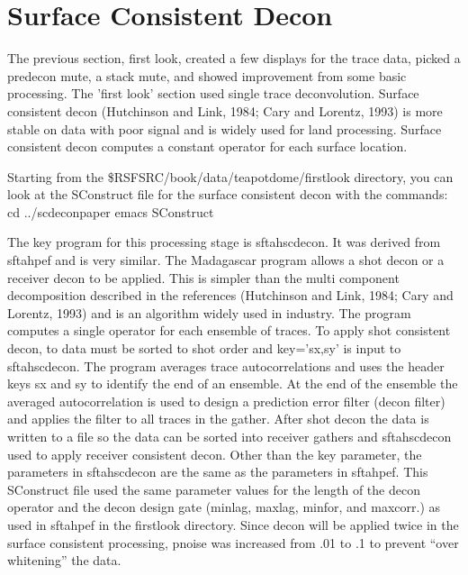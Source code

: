 

\section{Surface Consistent Decon}
The previous section, first look, created a few displays for the trace data, picked a predecon mute, a stack mute, and showed improvement from some basic processing.  The 'first look' section used single trace deconvolution.  Surface consistent decon (Hutchinson and Link, 1984; Cary and Lorentz, 1993) is more stable on data with poor signal and is widely used for land processing.  Surface consistent decon computes a constant operator for each surface location.  

Starting from the \$RSFSRC/book/data/teapotdome/firstlook directory, you can look at the SConstruct file for the surface consistent decon with the commands:
cd ../scdeconpaper
emacs SConstruct

The key program for this processing stage is sftahscdecon.  It was derived from sftahpef and is very similar.  The Madagascar program allows a shot decon or a receiver decon to be applied.  This is simpler than the multi component decomposition described in the references  (Hutchinson and Link, 1984; Cary and Lorentz, 1993) and is an algorithm widely used in industry.  The program computes a single operator for each ensemble of traces.  To apply shot consistent decon, to data must be sorted to shot order and key='sx,sy' is input to sftahscdecon.  The program averages trace autocorrelations and uses the header keys sx and sy to identify the end of an ensemble.  At the end of the ensemble the averaged autocorrelation is used to design a prediction error filter (decon filter) and applies the filter to all traces in the gather.  After shot decon the data is written to a file so the data can be sorted into receiver gathers and sftahscdecon used to apply receiver consistent decon.  Other than the key parameter, the parameters in sftahscdecon are the same as the parameters in sftahpef.  This SConstruct file used the same parameter values for the length of the decon operator and the decon design gate (minlag, maxlag, minfor, and maxcorr.) as used in sftahpef in the firstlook directory.  Since decon will be applied twice in the surface consistent processing, pnoise was increased from .01 to .1 to prevent “over whitening”  the data.

